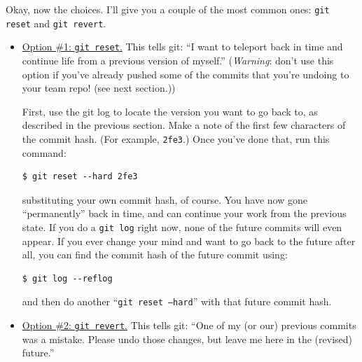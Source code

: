 \medskip

Okay, now the choices. I'll give you a couple of the most common ones:
\texttt{git reset} and \texttt{git revert}.

\vspace{-.1in}
\begin{itemize}
\itemsep.5em


\item \underline{Option \#1: \texttt{git reset}.} This tells git: ``I want to
teleport back in time and continue life from a previous version of myself.''
(\textit{Warning}: don't use this option if you've already pushed some of the
commits that you're undoing to your team repo! (see next section.))

First, use the git log to locate the version you want to go back to, as
described in the previous section. Make a note of the first few characters of
the commit hash. (For example, \texttt{2fe3}.) Once you've done that, run this
command:

\vspace{-.1in}
\begin{Verbatim}[fontsize=\small,samepage=true,frame=none]
  $ git reset --hard 2fe3
\end{Verbatim}
\vspace{-.1in}

substituting your own commit hash, of course. You have now gone ``permanently''
back in time, and can continue your work from the previous state. If you do a
\texttt{git log} right now, none of the future commits will even appear. If you
ever change your mind and want to go back to the future after all, you can find
the commit hash of the future commit using:

\vspace{-.1in}
\begin{Verbatim}[fontsize=\small,samepage=true,frame=none]
  $ git log --reflog
\end{Verbatim}
\vspace{-.1in}

and then do another ``\texttt{git reset --hard}'' with that future commit hash.



\item \underline{Option \#2: \texttt{git revert}.} This tells git: ``One of my
(or our) previous commits was a mistake. Please undo those changes, but leave
me here in the (revised) future.''


\end{itemize}
